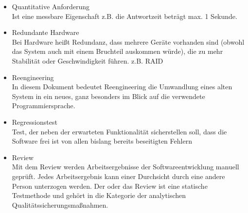 \begin{itemize}
\item 	Quantitative Anforderung\\
Ist eine messbare Eigenschaft z.B. die Antwortzeit beträgt max. 1 Sekunde.
\item 	Redundante Hardware\\
Bei Hardware heißt Redundanz, dass mehrere Geräte vorhanden sind (obwohl das System auch mit einem Bruchteil auskommen würde), die zu mehr Stabilität oder Geschwindigkeit führen. z.B. RAID
\item 	Reengineering\\
In diesem Dokument bedeutet Reengineering die Umwandlung eines alten System in ein neues, ganz besonders im Blick auf die verwendete Programmiersprache.
\item 	Regressionstest \\
Test, der neben der erwarteten Funktionalität sicherstellen soll, dass die Software frei ist von allen bislang bereits beseitigten Fehlern
\item 	Review\\
Mit dem Review werden Arbeitsergebnisse der Softwareentwicklung manuell geprüft. Jedes Arbeitsergebnis kann einer Durchsicht durch eine andere Person unterzogen werden. Der oder das Review ist eine statische Testmethode und gehört in die Kategorie der analytischen Qualitätssicherungsmaßnahmen.


\end{itemize}
